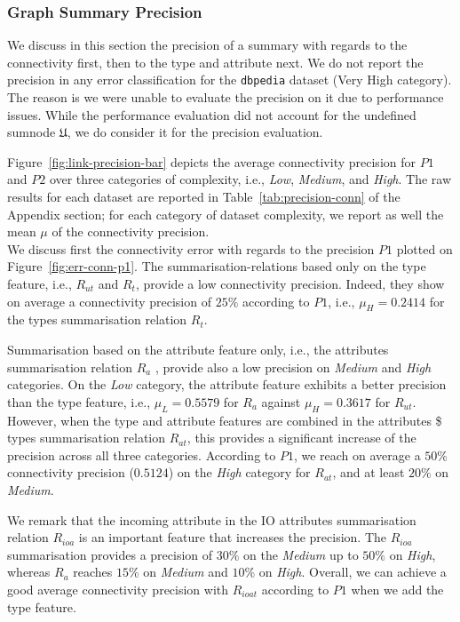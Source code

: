 

\subsubsection{Graph Summary Precision}

We discuss in this section the precision of a summary with regards to the \gls{connectivity} first, then to the \gls{type} and \gls{attribute} next. We do not report the precision in any error classification for the \texttt{dbpedia} dataset (Very High category). The reason is we were unable to evaluate the precision on it due to performance issues. While the performance evaluation did not account for the undefined sumnode $\mathfrak{U}$, we do consider it for the precision evaluation.


Figure~\ref{fig:link-precision-bar} depicts the average connectivity precision for $P1$ and $P2$ over three categories of complexity, i.e., \emph{Low}, \emph{Medium}, and \emph{High}. The raw results for each dataset are reported in Table~\ref{tab:precision-conn} of the Appendix section; for each category of dataset complexity, we report as well the mean $\mu$ of the connectivity precision.\\

We discuss first the connectivity error with regards to the precision $P1$ plotted on Figure~\ref{fig:err-conn-p1}.
The \glspl{summarisation-relation} based only on the type feature, i.e., $R_{ut}$ and $R_t$, provide a low connectivity precision. Indeed, they show on average a connectivity precision of $25\%$ according to $P1$, i.e., $\mu_H=0.2414$ for the types summarisation relation $R_t$.

Summarisation based on the attribute feature only, i.e., the attributes summarisation relation $R_a$ , provide also a low precision on \emph{Medium} and \emph{High} categories. On the \emph{Low} category, the attribute feature exhibits a better precision than the type feature, i.e., $\mu_L=0.5579$ for $R_a$ against $\mu_H=0.3617$ for $R_{ut}$. However, when the type and attribute features are combined in the attributes \$ types summarisation relation $R_{at}$, this provides a significant increase of the precision across all three categories. According to $P1$, we reach on average a $50\%$ connectivity precision ($0.5124$) on the \emph{High} category for $R_{at}$, and at least $20\%$ on \emph{Medium}.

We remark that the incoming attribute in the IO attributes summarisation relation $R_{ioa}$ is an important feature that increases the precision. The $R_{ioa}$ summarisation provides a precision of $30\%$ on the \emph{Medium} up to $50\%$ on \emph{High}, whereas $R_a$ reaches $15\%$ on \emph{Medium} and $10\%$ on \emph{High}. Overall, we can achieve a good average connectivity precision with $R_{ioat}$ according to $P1$ when we add the type feature.\\

